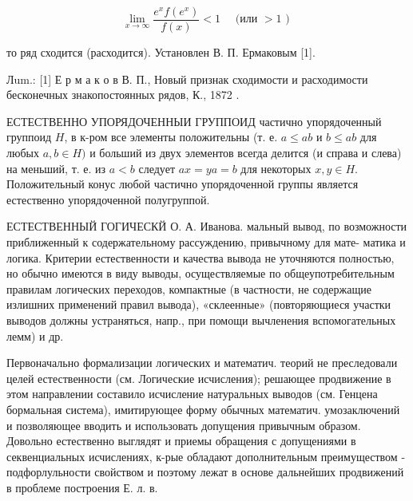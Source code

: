 \documentclass[10pt]{article}
\begin{document}
\[

\lim _{x \rightarrow \infty} \frac{e^{x} f\left(e^{x}\right)}{f(x)}<1 \quad \text { (или }>1 \text { ) }

\]



то ряд сходится (расходится). Установлен В. П. Ермаковым [1].



Лum.: [1] Е р м а к о в В. П., Новый признак сходимости и расходимости бесконечных знакопостоянных рядов, К., 1872 .



ЕСТЕСТВЕННО УПОРЯДОЧЕННЫИ ГРУППОИД частично упорядоченный группоид $H$, в к-ром все элементы положительны (т. е. $a \leqslant a b$ и $b \leqslant a b$ для любых $a, b \in H)$ и больший из двух элементов всегда делится (и справа и слева) на меньший, т. е. из $a<b$ следует $a x=y a=b$ для некоторых $x, y \in H$. Положительный конус любой частично упорядоченной группы является естественно упорядоченной полугруппой.



ЕСТЕСТВЕННЫЙ ГОГИЧЕСКЙ О. А. Иванова. мальный вывод, по возможности приближенный к содержательному рассуждению, привычному для мате- матика и логика. Критерии естественности и качества вывода не уточняются полностью, но обычно имеются в виду выводы, осуществляемые по общеупотребительным правилам логических переходов, компактные (в частности, не содержащие излишних применений правил вывода), «склеенные» (повторяющиеся участки выводов должны устраняться, напр., при помощи вычленения вспомогательных лемм) и др.



Первоначально формализации логических и математич. теорий не преследовали целей естественности (см. Логические исчисления); решающее продвижение в этом направлении составило исчисление натуральных выводов (см. Генцена бормальная система), имитирующее форму обычных математич. умозаключений и позволяющее вводить и использовать допущения привычным образом. Довольно естественно выглядят и приемы обращения с допущениями в секвенциальных исчислениях, к-рые обладают дополнительным преимуществом - подфорлульности свойством и поэтому лежат в основе дальнейших продвижений в проблеме построения Е. л. в.
\end{document}
